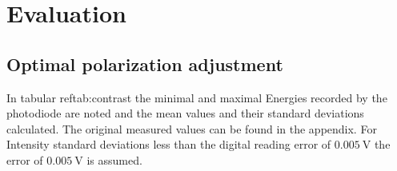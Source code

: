 \section{Evaluation}


\subsection{Optimal polarization adjustment}
In tabular ref{tab:contrast} the minimal and maximal Energies recorded by the
photodiode are noted and the mean values and their standard deviations calculated. 
The original measured values can be found in the appendix.
For Intensity standard deviations less than the digital reading error of
$\qty{0.005}{\volt}$ the error of $ \qty{0.005}{\volt}$ is assumed.

